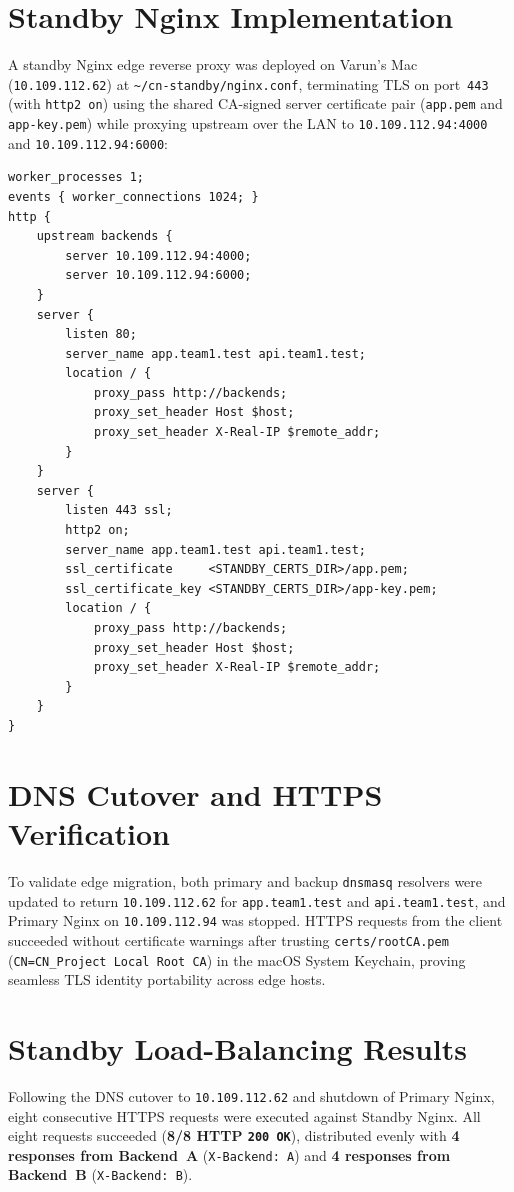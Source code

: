 \documentclass[conference]{IEEEtran}
\begin{document}
\section{Standby Nginx Implementation}
A standby Nginx edge reverse proxy was deployed on Varun's Mac (\texttt{10.109.112.62}) at \texttt{\textasciitilde/cn-standby/nginx.conf}, terminating TLS on port~\texttt{443} (with \texttt{http2 on}) using the shared CA-signed server certificate pair (\texttt{app.pem} and \texttt{app-key.pem}) while proxying upstream over the LAN to \texttt{10.109.112.94:4000} and \texttt{10.109.112.94:6000}:

\begin{lstlisting}[caption={Verified Standby Nginx Configuration (\texttt{10.109.112.62})}]
worker_processes 1;
events { worker_connections 1024; }
http {
    upstream backends {
        server 10.109.112.94:4000;
        server 10.109.112.94:6000;
    }
    server {
        listen 80;
        server_name app.team1.test api.team1.test;
        location / {
            proxy_pass http://backends;
            proxy_set_header Host $host;
            proxy_set_header X-Real-IP $remote_addr;
        }
    }
    server {
        listen 443 ssl;
        http2 on;
        server_name app.team1.test api.team1.test;
        ssl_certificate     <STANDBY_CERTS_DIR>/app.pem;
        ssl_certificate_key <STANDBY_CERTS_DIR>/app-key.pem;
        location / {
            proxy_pass http://backends;
            proxy_set_header Host $host;
            proxy_set_header X-Real-IP $remote_addr;
        }
    }
}
\end{lstlisting}

\section{DNS Cutover and HTTPS Verification}
To validate edge migration, both primary and backup \texttt{dnsmasq} resolvers were updated to return \texttt{10.109.112.62} for \texttt{app.team1.test} and \texttt{api.team1.test}, and Primary Nginx on \texttt{10.109.112.94} was stopped. HTTPS requests from the client succeeded without certificate warnings after trusting \texttt{certs/rootCA.pem} (\texttt{CN=CN\_Project Local Root CA}) in the macOS System Keychain, proving seamless TLS identity portability across edge hosts.

\section{Standby Load-Balancing Results}
Following the DNS cutover to \texttt{10.109.112.62} and shutdown of Primary Nginx, eight consecutive HTTPS requests were executed against Standby Nginx. All eight requests succeeded (\textbf{8/8 HTTP \texttt{200 OK}}), distributed evenly with \textbf{4 responses from Backend~A} (\texttt{X-Backend: A}) and \textbf{4 responses from Backend~B} (\texttt{X-Backend: B}).
\end{document}
